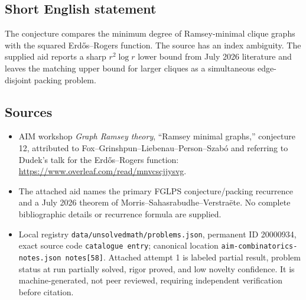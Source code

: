 \documentclass[11pt]{article}
\begin{document}
\subsection{Short English statement}
The conjecture compares the minimum degree of Ramsey-minimal clique graphs with the squared Erd\H{o}s--Rogers function. The source has an index ambiguity. The supplied aid reports a sharp $r^2\log r$ lower bound from July 2026 literature and leaves the matching upper bound for larger cliques as a simultaneous edge-disjoint packing problem.
\subsection{Sources}
\begin{itemize}
\item AIM workshop \emph{Graph Ramsey theory}, ``Ramsey minimal graphs,'' conjecture 12, attributed to Fox--Grinshpun--Liebenau--Person--Szab\'o and referring to Dudek's talk for the Erd\H{o}s--Rogers function: \url{https://www.overleaf.com/read/mnvcscjjysvg}.
\item The attached aid names the primary FGLPS conjecture/packing recurrence and a July 2026 theorem of Morris--Sahasrabudhe--Verstra\"ete. No complete bibliographic details or recurrence formula are supplied.
\item Local registry \texttt{data/unsolvedmath/problems.json}, permanent ID 20000934, exact source code \texttt{catalogue entry}; canonical location \texttt{aim-combinatorics-notes.json notes[58]}. Attached attempt 1 is labeled partial result, problem status at run partially solved, rigor proved, and low novelty confidence. It is machine-generated, not peer reviewed, requiring independent verification before citation.
\end{itemize}
\end{document}
